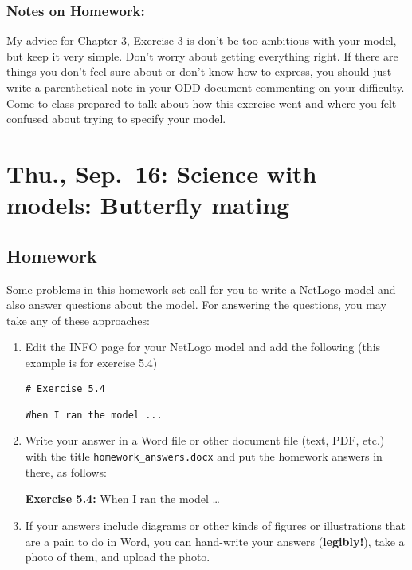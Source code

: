 \documentclass[
]{article}
\begin{document}
\hypertarget{notes-on-homework-1}{%
\subsubsection{Notes on Homework:}\label{notes-on-homework-1}}

My advice for Chapter 3, Exercise 3 is don't be too ambitious with your
model, but keep it very simple. Don't worry about getting everything
right. If there are things you don't feel sure about or don't know how
to express, you should just write a parenthetical note in your ODD
document commenting on your difficulty. Come to class prepared to talk
about how this exercise went and where you felt confused about trying to
specify your model.

\hypertarget{thu.-sep.-16-science-with-models-butterfly-mating}{%
\section{Thu., Sep.~16: Science with models: Butterfly
mating}\label{thu.-sep.-16-science-with-models-butterfly-mating}}

\hypertarget{homework-4}{%
\subsection{Homework}\label{homework-4}}

Some problems in this homework set call for you to write a NetLogo model
and also answer questions about the model. For answering the questions,
you may take any of these approaches:

\begin{enumerate}
\def\labelenumi{\arabic{enumi}.}
\item
  Edit the INFO page for your NetLogo model and add the following (this
  example is for exercise 5.4)

\begin{verbatim}
# Exercise 5.4

When I ran the model ...
\end{verbatim}
\item
  Write your answer in a Word file or other document file (text, PDF,
  etc.) with the title \texttt{homework\_answers.docx} and put the
  homework answers in there, as follows:

  \textbf{Exercise 5.4:} When I ran the model \ldots{}
\item
  If your answers include diagrams or other kinds of figures or
  illustrations that are a pain to do in Word, you can hand-write your
  answers (\textbf{legibly!}), take a photo of them, and upload the
  photo.
\end{enumerate}
\end{document}
